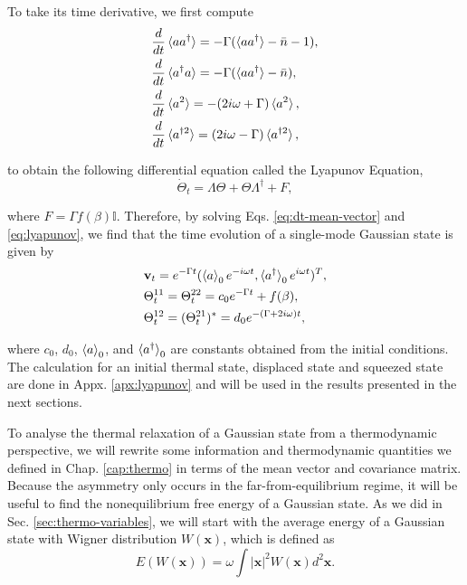 \noindent To take its time derivative, we first compute
\begin{align}
    &\frac{d}{dt}\braket{{a} {a}^\dagger} = -\Gamma (\braket{{a}{a}^\dagger} - \bar{n} - 1),\\
    &\frac{d}{dt}\braket{{a}^\dagger {a}} = -\Gamma (\braket{{a}{a}^\dagger} - \bar{n}),\\
    &\frac{d}{dt}\braket{{a}^2} = -(2i\omega + \Gamma)\braket{{a}^2},\\
    &\frac{d}{dt}\braket{{a}^{\dagger 2}} = (2i\omega - \Gamma)\braket{{a}^{\dagger 2}},
\end{align}

\noindent to obtain the following differential equation called the Lyapunov Equation,
\begin{equation}
    \dot{\Theta}_t = \Lambda \Theta + \Theta \Lambda^\dagger + F,
    \label{eq:lyapunov}
\end{equation}

\noindent where $F = \Gamma f(\beta) \mathbb{I}$. Therefore, by solving Eqs. \eqref{eq:dt-mean-vector} and \eqref{eq:lyapunov}, we find that the time evolution of a single-mode Gaussian state is given by
\begin{align}
    &\mathbf{v}_t = e^{-\Gamma t} (\braket{a}_0 e^{-i \omega t}, \braket{a^\dagger}_0 e^{i \omega t})^T,
    \label{eq:solution-v}\\
    &\Theta_t^{11} = \Theta_t^{22} = c_{0} e^{-\Gamma t} + f(\beta),
    \label{eq:solution-theta-diag}\\
    &\Theta_t^{12} = (\Theta_t^{21})^* = d_{0} e^{-(\Gamma + 2i\omega)t},
    \label{eq:solution-theta-antidiag}
\end{align}

\noindent where $c_0$, $d_0$, $\braket{a}_0$, and $\braket{a^\dagger}_0$ are constants obtained from the initial conditions. The calculation for an initial thermal state, displaced state and squeezed state are done in Appx. \ref{apx:lyapunov} and will be used in the results presented in the next sections.

To analyse the thermal relaxation of a Gaussian state from a thermodynamic perspective, we will rewrite some information and thermodynamic quantities we defined in Chap. \ref{cap:thermo} in terms of the mean vector and covariance matrix. Because the asymmetry only occurs in the far-from-equilibrium regime, it will be useful to find the nonequilibrium free energy of a Gaussian state. As we did in Sec. \ref{sec:thermo-variables}, we will start with the average energy of a Gaussian state with Wigner distribution $W(\mathbf{x})$, which is defined as
\begin{equation}
    E(W(\mathbf{x})) = \omega \int |\mathbf{x}|^2 W(\mathbf{x}) d^2 \mathbf{x}.
\end{equation}

